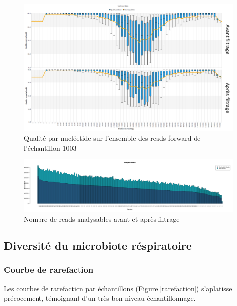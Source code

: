 \documentclass[12pt,a4paper]{article}
\begin{document}
\begin{figure}[!ht]
\begin{center}
\includegraphics[scale=0.45]{img/duo_merging.png}\hfill
\end{center}
\caption{Qualité par nucléotide sur l'ensemble des reads forward de l'échantillon 1003}
\label{fastqc merging}
\end{figure}

\begin{figure}[!ht]
\begin{center}
\includegraphics[scale=0.25]{img/pipeline.png}\hfill
\end{center}
\caption{Nombre de reads analysables avant et après filtrage}
\label{all}
\end{figure}

\newpage

\subsection{Diversité du microbiote réspiratoire}
\subsubsection{Courbe de rarefaction}

Les courbes de rarefaction par échantillons (Figure \ref{rarefaction}) s’aplatisse précocement, témoignant d’un très bon niveau échantillonnage.
\end{document}
